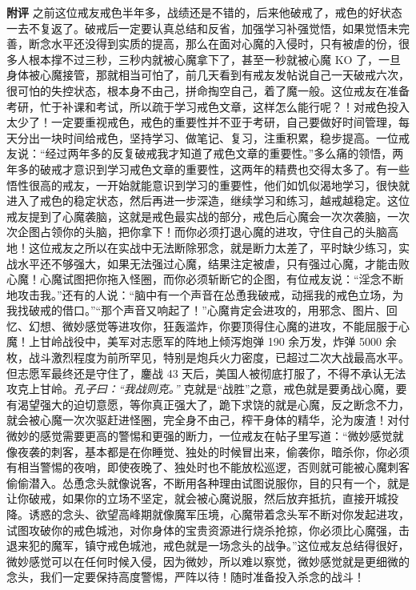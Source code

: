 \begin{case}
    \textbf{附评} 之前这位戒友戒色半年多，战绩还是不错的，后来他破戒了，戒色的好状态一去不复返了。破戒后一定要认真总结和反省，加强学习补强觉悟，如果觉悟未完善，断念水平还没得到实质的提高，那么在面对心魔的入侵时，只有被虐的份，很多人根本撑不过三秒，三秒内就被心魔拿下了，甚至一秒就被心魔 KO 了，一旦身体被心魔接管，那就相当可怕了，前几天看到有戒友发帖说自己一天破戒六次，很可怕的失控状态，根本身不由己，拼命掏空自己，着了魔一般。这位戒友在准备考研，忙于补课和考试，所以疏于学习戒色文章，这样怎么能行呢？！对戒色投入太少了！一定要重视戒色，戒色的重要性并不亚于考研，自己要做好时间管理，每天分出一块时间给戒色，坚持学习、做笔记、复习，注重积累，稳步提高。一位戒友说：“经过两年多的反复破戒我才知道了戒色文章的重要性。”多么痛的领悟，两年多的破戒才意识到学习戒色文章的重要性，这两年的精费也交得太多了。有一些悟性很高的戒友，一开始就能意识到学习的重要性，他们如饥似渴地学习，很快就进入了戒色的稳定状态，然后再进一步深造，继续学习和练习，越戒越稳定。这位戒友提到了心魔袭脑，这就是戒色最实战的部分，戒色后心魔会一次次袭脑，一次次企图占领你的头脑，把你拿下！而你必须打退心魔的进攻，守住自己的头脑高地！这位戒友之所以在实战中无法断除邪念，就是断力太差了，平时缺少练习，实战水平还不够强大，如果无法强过心魔，结果注定被虐，只有强过心魔，才能击败心魔！心魔试图把你拖入怪圈，而你必须斩断它的企图，有位戒友说：“淫念不断地攻击我。”还有的人说：“脑中有一个声音在怂恿我破戒，动摇我的戒色立场，为我找破戒的借口。”“那个声音又响起了！”心魔肯定会进攻的，用邪念、图片、回忆、幻想、微妙感觉等进攻你，狂轰滥炸，你要顶得住心魔的进攻，不能屈服于心魔！上甘岭战役中，美军对志愿军的阵地上倾泻炮弹 190 余万发，炸弹 5000 余枚，战斗激烈程度为前所罕见，特别是炮兵火力密度，已超过二次大战最高水平。但志愿军最终还是守住了，鏖战 43 天后，美国人被彻底打服了，不得不承认无法攻克上甘岭。\textit{孔子曰：“我战则克。”} 克就是“战胜”之意，戒色就是要勇战心魔，要有渴望强大的迫切意愿，等你真正强大了，跪下求饶的就是心魔，反之断念不力，就会被心魔一次次驱赶进怪圈，完全身不由己，榨干身体的精华，沦为废渣！对付微妙的感觉需要更高的警惕和更强的断力，一位戒友在帖子里写道：“微妙感觉就像夜袭的刺客，基本都是在你睡觉、独处的时候冒出来，偷袭你，暗杀你，你必须有相当警惕的夜哨，即使夜晚了、独处时也不能放松巡逻，否则就可能被心魔刺客偷偷潜入。怂恿念头就像说客，不断用各种理由试图说服你，目的只有一个，就是让你破戒，如果你的立场不坚定，就会被心魔说服，然后放弃抵抗，直接开城投降。诱惑的念头、欲望高峰期就像魔军压境，心魔带着念头军不断对你发起进攻，试图攻破你的戒色城池，对你身体的宝贵资源进行烧杀抢掠，你必须比心魔强，击退来犯的魔军，镇守戒色城池，戒色就是一场念头的战争。”这位戒友总结得很好，微妙感觉可以在任何时候入侵，因为微妙，所以难以察觉，微妙感觉就是更细微的念头，我们一定要保持高度警惕，严阵以待！随时准备投入杀念的战斗！
\end{case}

